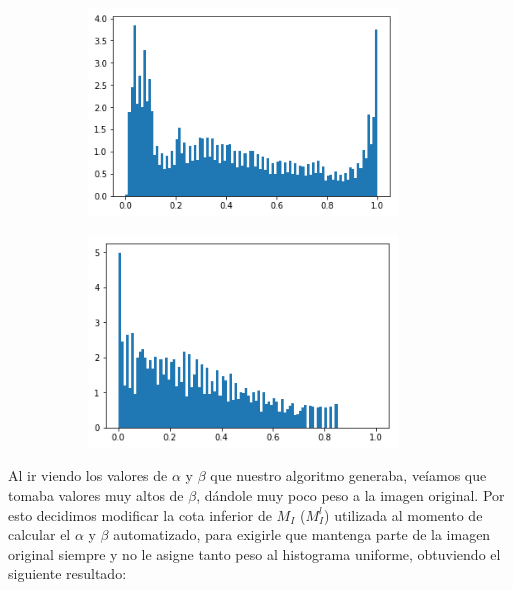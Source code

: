 \documentclass[10pt, a4paper]{article}
\begin{document}
\begin{figure}[H]	
	\centering
    \begin{subfigure}{0.5\textwidth}
	\centering
        \includegraphics[width=0.9\textwidth]{rosedal-histograma-original.png}
    \end{subfigure}\hfill
    \begin{subfigure}{0.5\textwidth}
    	\centering
        \includegraphics[width=0.9\textwidth]{rosedal-histograma-final.png}
    \end{subfigure}\hfill	
\end{figure}

Al ir viendo los valores de $\alpha$ y $\beta$ que nuestro algoritmo generaba, veíamos que tomaba valores muy altos de $\beta$, dándole muy poco peso a la imagen original. Por esto decidimos modificar la cota inferior de $M_{I}$ ($M_{I}^l$) utilizada al momento de calcular el $\alpha$ y $\beta$ automatizado, para exigirle que mantenga parte de la imagen original siempre y no le asigne tanto peso al histograma uniforme, obtuviendo el siguiente resultado:
\end{document}
